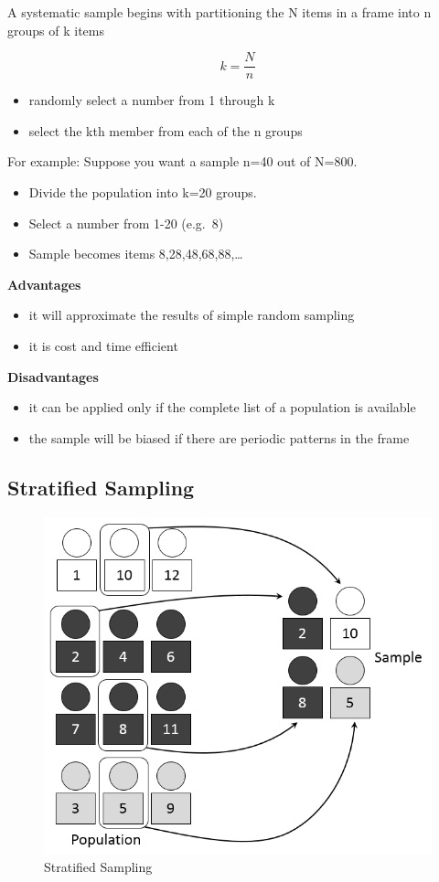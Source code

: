 \documentclass[
]{book}
\begin{document}
A systematic sample begins with partitioning the N items in a frame into n groups of k items

\[k=\frac{N}{n}\]

\begin{itemize}
\item
  randomly select a number from 1 through k
\item
  select the kth member from each of the n groups
\end{itemize}

For example: Suppose you want a sample n=40 out of N=800.

\begin{itemize}
\item
  Divide the population into k=20 groups.
\item
  Select a number from 1-20 (e.g.~8)
\item
  Sample becomes items 8,28,48,68,88,\ldots{}
\end{itemize}

\textbf{Advantages}

\begin{itemize}
\item
  it will approximate the results of simple random sampling
\item
  it is cost and time efficient
\end{itemize}

\textbf{Disadvantages}

\begin{itemize}
\item
  it can be applied only if the complete list of a population is available
\item
  the sample will be biased if there are periodic patterns in the frame
\end{itemize}

\hypertarget{stratified-sampling}{%
\subsection{Stratified Sampling}\label{stratified-sampling}}

\begin{figure}

{\centering \includegraphics[width=0.5\linewidth]{images/Stratified} 

}

\caption{Stratified Sampling}\label{fig:unnamed-chunk-25}
\end{figure}
\end{document}
